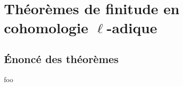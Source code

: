 







\chapter{Théorèmes de finitude en cohomologie \texorpdfstring{$\ell$}{l}-adique}\label{VII}












\section{Énoncé des théorèmes}\label{VII:1}

\begin{theorem_}\label{VII:1-1}
foo
\end{theorem_}

